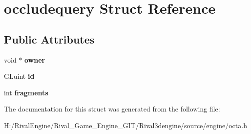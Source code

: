 \hypertarget{structoccludequery}{}\section{occludequery Struct Reference}
\label{structoccludequery}
\subsection*{Public Attributes}
\begin{DoxyCompactItemize}
\item 
\mbox{\label{structoccludequery_a3a96c04ddce30957663ef933528b9d06}} 
void $\ast$ {\bfseries owner}
\item 
\mbox{\label{structoccludequery_aea4ec80644045ff005598bb0aecbc262}} 
G\+Luint {\bfseries id}
\item 
\mbox{\label{structoccludequery_ae6d3862bd841e4d071f3966dfccb478d}} 
int {\bfseries fragments}
\end{DoxyCompactItemize}


The documentation for this struct was generated from the following file\+:\begin{DoxyCompactItemize}
\item 
H\+:/\+Rival\+Engine/\+Rival\+\_\+\+Game\+\_\+\+Engine\+\_\+\+G\+I\+T/\+Rival3dengine/source/engine/octa.\+h\end{DoxyCompactItemize}
